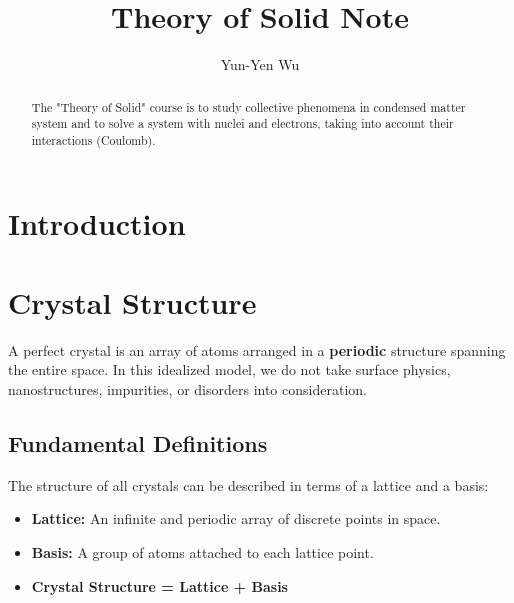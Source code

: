 \documentclass[10pt, a4paper]{article}
\title{Theory of Solid Note}
\author{Yun-Yen Wu}
\date{}
\begin{document}
\maketitle

\begin{abstract}
The "Theory of Solid" course is to study collective phenomena in condensed matter system and to solve a system with nuclei and electrons, taking into account their interactions (Coulomb). 
\end{abstract}

\newpage 

\setcounter{page}{1} 

\section{Introduction}

\section{Crystal Structure}

A perfect crystal is an array of atoms arranged in a \textbf{periodic} structure spanning the entire space. In this idealized model, we do not take surface physics, nanostructures, impurities, or disorders into consideration.

\subsection*{Fundamental Definitions}
The structure of all crystals can be described in terms of a lattice and a basis:
\begin{itemize}
    \item \textbf{Lattice:} An infinite and periodic array of discrete points in space.
    \item \textbf{Basis:} A group of atoms attached to each lattice point.
    \item \textbf{Crystal Structure = Lattice + Basis}
\end{itemize}
\end{document}
